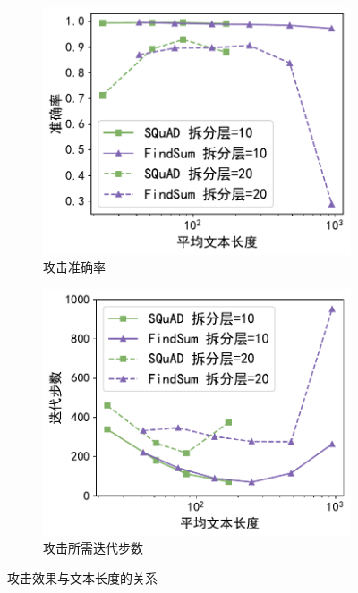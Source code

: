\begin{figure}[h!]
    \centering
    \begin{subfigure}{0.48\linewidth}
    \includegraphics[width=\linewidth]{Z_Resources/perm-llm_seqlen-acc.pdf}
    \caption{攻击准确率}
    \end{subfigure}
    \begin{subfigure}{0.48\linewidth}    
    \includegraphics[width=\linewidth]{Z_Resources/perm-llm_seqlen-steps.pdf}
    \caption{攻击所需迭代步数}    
    \end{subfigure}
    \caption{攻击效果与文本长度的关系}
    \label{fig:perm-llm:attack-seqlen}
\end{figure}


